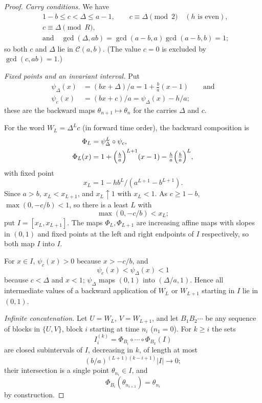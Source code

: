 \documentclass[11pt,reqno]{amsart}
\theoremstyle{definition}
\theoremstyle{remark}
\begin{document}
\begin{proof}\leavevmode\label{proof:42}
\emph{Carry conditions.} We have
\[
\begin{aligned}
&1-b\le c<\Delta\le a-1,\qquad c\equiv\Delta\pmod2\quad(h\text{ is even}),\\
&c\equiv\Delta\pmod R,\\
&\text{and}\quad\gcd(\Delta,ab)=\gcd(a-b,a)\gcd(a-b,b)=1;
\end{aligned}
\]
so both \(c\) and
\(\Delta\) lie in \(\mathcal C(a,b)\). (The value \(c=0\) is excluded by
\(\gcd(c,ab)=1\).)

\emph{Fixed points and an invariant interval.} Put
\[
\begin{aligned}
\psi_\Delta(x)&=(bx+\Delta)/a=1+\tfrac ba(x-1)\qquad \text{and}\\
\psi_c(x)&=(bx+c)/a=\psi_\Delta(x)-h/a;
\end{aligned}
\]
these are the backward maps
\(\theta_{n+1}\mapsto\theta_n\) for the carries \(\Delta\) and \(c\).

For the word \(W_L=\Delta^Lc\) (in forward time order), the backward
composition is
\[
\begin{aligned}
\Phi_L&=\psi_\Delta^L\circ\psi_c,\\
\Phi_L(x)&=1+\Bigl(\tfrac ba\Bigr)^{L+1}(x-1)-\tfrac ha\Bigl(\tfrac ba\Bigr)^L,
\end{aligned}
\]
with fixed point
\[
x_L=1-hb^L/(a^{L+1}-b^{L+1}).
\]
Since \(a>b\),
\(x_L<x_{L+1}\), and \(x_L\uparrow1\) with \(x_L<1\). As
\(c\ge1-b\), \(\max(0,-c/b)<1\), so there is a least \(L\) with
\[
\max(0,-c/b)<x_L;
\]
put \(I=[x_L,x_{L+1}]\). The maps
\(\Phi_L,\Phi_{L+1}\) are increasing affine maps with slopes in
\((0,1)\) and fixed points at the left and right endpoints of \(I\)
respectively, so both map \(I\) into \(I\).

For \(x\in I\),
\(\psi_c(x)>0\) because \(x>-c/b\), and
\[
\psi_c(x)<\psi_\Delta(x)<1
\]
because \(c<\Delta\) and \(x<1\);
\(\psi_\Delta\) maps \((0,1)\) into \((\Delta/a,1)\). Hence all
intermediate values of a backward application of \(W_L\) or
\(W_{L+1}\) starting in \(I\) lie in \((0,1)\).

\emph{Infinite concatenation.} Let \(U=W_L\), \(V=W_{L+1}\), and let
\(B_1B_2\cdots\) be any sequence of blocks in \(\{U,V\}\), block \(i\)
starting at time \(n_i\) (\(n_1=0\)). For \(k\ge i\) the sets
\[
I_i^{(k)}=\Phi_{B_i}\circ\cdots\circ\Phi_{B_k}(I)
\]
are closed
subintervals of \(I\), decreasing in \(k\), of length at most
\[
(b/a)^{(L+1)(k-i+1)}|I|\to0;
\]
their intersection is a single point
\(\theta_{n_i}\in I\), and
\[
\Phi_{B_i}(\theta_{n_{i+1}})=\theta_{n_i}
\]
by construction.


\end{proof}
\end{document}
